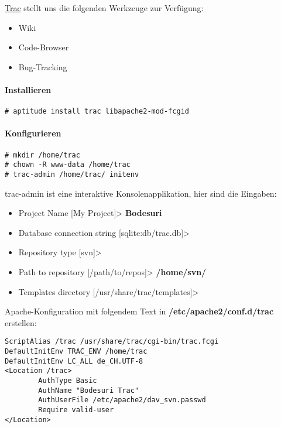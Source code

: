 \documentclass[12pt,halfparskip]{scrreprt}
\begin{document}
\href{http://trac.edgewall.org/}{Trac} stellt uns die folgenden Werkzeuge zur Verfügung:

\begin{itemize}
	\item Wiki
	\item Code-Browser
	\item Bug-Tracking
\end{itemize}

\paragraph{Installieren}

\begin{verbatim}
# aptitude install trac libapache2-mod-fcgid
\end{verbatim}

\paragraph{Konfigurieren}

\begin{verbatim}
# mkdir /home/trac
# chown -R www-data /home/trac
# trac-admin /home/trac/ initenv
\end{verbatim}

trac-admin ist eine interaktive Konsolenapplikation, hier sind die Eingaben:

\begin{itemize}
	\item Project Name [My Project]> \textbf{Bodesuri}
	\item Database connection string [sqlite:db/trac.db]>
	\item Repository type [svn]>
	\item Path to repository [/path/to/repos]> \textbf{/home/svn/}
	\item Templates directory [/usr/share/trac/templates]>
\end{itemize}

Apache-Konfiguration mit folgendem Text in \textbf{/etc/apache2/conf.d/trac} erstellen:

\begin{verbatim}
ScriptAlias /trac /usr/share/trac/cgi-bin/trac.fcgi
DefaultInitEnv TRAC_ENV /home/trac
DefaultInitEnv LC_ALL de_CH.UTF-8
<Location /trac>
        AuthType Basic
        AuthName "Bodesuri Trac"
        AuthUserFile /etc/apache2/dav_svn.passwd
        Require valid-user
</Location>
\end{verbatim}
\end{document}
